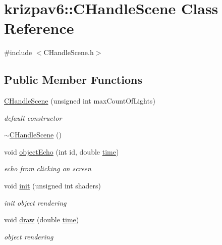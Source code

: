 \hypertarget{classkrizpav6_1_1_c_handle_scene}{}\section{krizpav6\+::C\+Handle\+Scene Class Reference}
\label{classkrizpav6_1_1_c_handle_scene}


{\ttfamily \#include $<$C\+Handle\+Scene.\+h$>$}

\subsection*{Public Member Functions}
\begin{DoxyCompactItemize}
\item 
\mbox{\hyperlink{classkrizpav6_1_1_c_handle_scene_a06e81656b1f20abc13ac55ff4acc3df3}{C\+Handle\+Scene}} (unsigned int max\+Count\+Of\+Lights)
\begin{DoxyCompactList}\small\item\em default constructor \end{DoxyCompactList}\item 
\mbox{\hyperlink{classkrizpav6_1_1_c_handle_scene_ab18680142307462378964ca9ece4917f}{$\sim$\+C\+Handle\+Scene}} ()
\item 
void \mbox{\hyperlink{classkrizpav6_1_1_c_handle_scene_a9a4b8d6945d90921ed4f5568d3e14236}{object\+Echo}} (int id, double \mbox{\hyperlink{namespacekrizpav6_a8891720fdfe0575d613886ce3cf96223}{time}})
\begin{DoxyCompactList}\small\item\em echo from clicking on screen \end{DoxyCompactList}\item 
void \mbox{\hyperlink{classkrizpav6_1_1_c_handle_scene_a1285e3291f1de95d5cb128685a3ae41f}{init}} (unsigned int shaders)
\begin{DoxyCompactList}\small\item\em init object rendering \end{DoxyCompactList}\item 
void \mbox{\hyperlink{classkrizpav6_1_1_c_handle_scene_a2676a363356cb3d48b53ce09fd2f644a}{draw}} (double \mbox{\hyperlink{namespacekrizpav6_a8891720fdfe0575d613886ce3cf96223}{time}})
\begin{DoxyCompactList}\small\item\em object rendering \end{DoxyCompactList}\item 

\end{DoxyCompactItemize}
